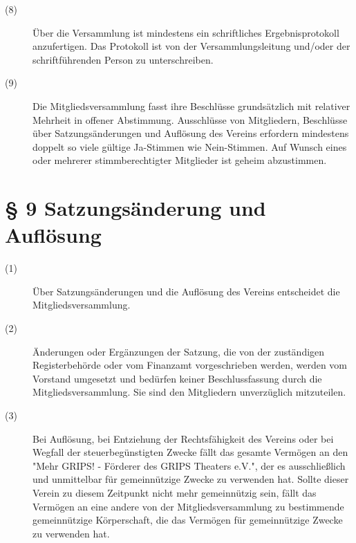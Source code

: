 \documentclass[a4paper,12pt]{scrartcl}
\begin{document}
\begin{description}
\item[(8)] Über die Versammlung ist mindestens ein schriftliches Ergebnisprotokoll anzufertigen. Das Protokoll ist von der Versammlungsleitung und/oder der schriftführenden Person zu unterschreiben.
\item[(9)] Die Mitgliedsversammlung fasst ihre Beschlüsse grundsätzlich mit relativer Mehrheit in offener Abstimmung. Ausschlüsse von Mitgliedern, Beschlüsse über Satzungsänderungen und Auflösung des Vereins erfordern mindestens doppelt so viele gültige Ja-Stimmen wie Nein-Stimmen. Auf Wunsch eines oder mehrerer stimmberechtigter Mitglieder ist geheim abzustimmen.

\end{description}


\section*{\S{} 9 Satzungsänderung und Auflösung}
\begin{description} 

\item[(1)] Über Satzungsänderungen und die Auflösung des Vereins entscheidet die Mitgliedsversammlung.
\item[(2)] Änderungen oder Ergänzungen der Satzung, die von der zuständigen Registerbehörde oder vom Finanzamt vorgeschrieben werden, werden vom Vorstand umgesetzt und bedürfen keiner Beschlussfassung durch die Mitgliedsversammlung. Sie sind den Mitgliedern unverzüglich mitzuteilen.
\item[(3)] Bei Auflösung, bei Entziehung der Rechtsfähigkeit des Vereins oder bei Wegfall der steuerbegünstigten Zwecke fällt das gesamte Vermögen an den "Mehr GRIPS! - Förderer des GRIPS Theaters e.V.", der es ausschließlich und unmittelbar für gemeinnützige Zwecke zu verwenden hat. Sollte dieser Verein zu diesem Zeitpunkt nicht mehr gemeinnützig sein, fällt das Vermögen an eine andere von der Mitgliedsversammlung zu bestimmende gemeinnützige Körperschaft, die das Vermögen für gemeinnützige Zwecke zu verwenden hat.

\end{description}
\end{document}
